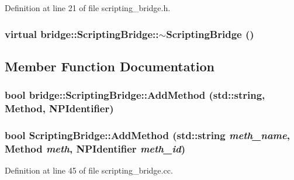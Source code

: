 Definition at line 21 of file scripting\_\-bridge.h.

\hypertarget{classbridge_1_1_scripting_bridge_ac47a1623f245bd55f96ea8cb007b24cb}{
\subsubsection[{$\sim$ScriptingBridge}]{\setlength{\rightskip}{0pt plus 5cm}virtual bridge::ScriptingBridge::$\sim$ScriptingBridge ()}}
\label{classbridge_1_1_scripting_bridge_ac47a1623f245bd55f96ea8cb007b24cb}


\subsection{Member Function Documentation}
\hypertarget{classbridge_1_1_scripting_bridge_a24f9e87d1beed97f7231010636d5af55}{
\subsubsection[{AddMethod}]{\setlength{\rightskip}{0pt plus 5cm}bool bridge::ScriptingBridge::AddMethod (std::string, \/  {\bf Method}, \/  NPIdentifier)}}
\label{classbridge_1_1_scripting_bridge_a24f9e87d1beed97f7231010636d5af55}
\hypertarget{classbridge_1_1_scripting_bridge_aa5f733424325e07c884397e3f301f01c}{
\subsubsection[{AddMethod}]{\setlength{\rightskip}{0pt plus 5cm}bool ScriptingBridge::AddMethod (std::string {\em meth\_\-name}, \/  {\bf Method} {\em meth}, \/  NPIdentifier {\em meth\_\-id})}}
\label{classbridge_1_1_scripting_bridge_aa5f733424325e07c884397e3f301f01c}


Definition at line 45 of file scripting\_\-bridge.cc.

